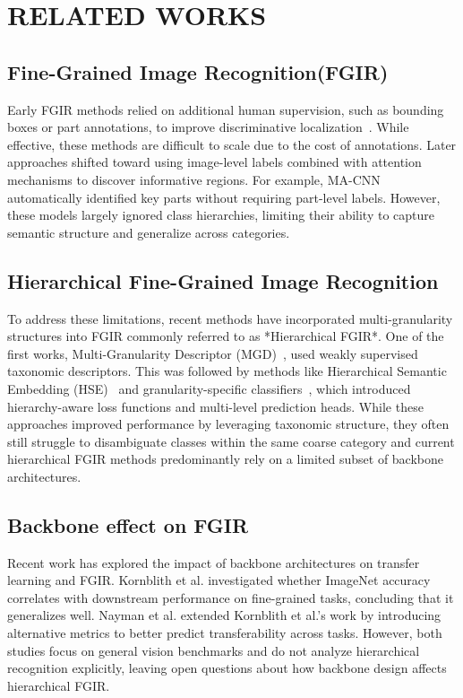\documentclass[10pt,twocolumn]{article}
\begin{document}
\section{RELATED WORKS}
\subsection{Fine-Grained Image Recognition(FGIR)}
Early FGIR methods relied on additional human supervision, such as bounding boxes or part annotations, to improve discriminative localization~\cite{zhang_part-based_2014}. While effective, these methods are difficult to scale due to the cost of annotations. Later approaches shifted toward using image-level labels combined with attention mechanisms to discover informative regions. For example, MA-CNN~\cite{zheng_learning_2017} automatically identified key parts without requiring part-level labels. However, these models largely ignored class hierarchies, limiting their ability to capture semantic structure and generalize across categories.

\vspace{-0.2cm}
\subsection{Hierarchical Fine-Grained Image Recognition}
To address these limitations, recent methods have incorporated multi-granularity structures into FGIR commonly referred to as *Hierarchical FGIR*. One of the first works, Multi-Granularity Descriptor (MGD)~\cite{wang_multiple_2015}, used weakly supervised taxonomic descriptors. This was followed by methods like Hierarchical Semantic Embedding (HSE)~\cite{chen_fine-grained_2018} and granularity-specific classifiers~\cite{chang_your_2021}, which introduced hierarchy-aware loss functions and multi-level prediction heads. While these approaches improved performance by leveraging taxonomic structure, they often still struggle to disambiguate classes within the same coarse category and current hierarchical FGIR methods predominantly rely on a limited subset of backbone architectures.

\vspace{-0.2cm}
\subsection{Backbone effect on FGIR}
Recent work has explored the impact of backbone architectures on transfer learning and FGIR. Kornblith et al. \cite{kornblith_better_2019} investigated whether ImageNet accuracy correlates with downstream performance on fine-grained tasks, concluding that it generalizes well. Nayman et al. \cite{nayman_diverse_2022} extended Kornblith et al.'s work by introducing alternative metrics to better predict transferability across tasks. However, both studies focus on general vision benchmarks and do not analyze hierarchical recognition explicitly, leaving open questions about how backbone design affects hierarchical FGIR.
\end{document}
